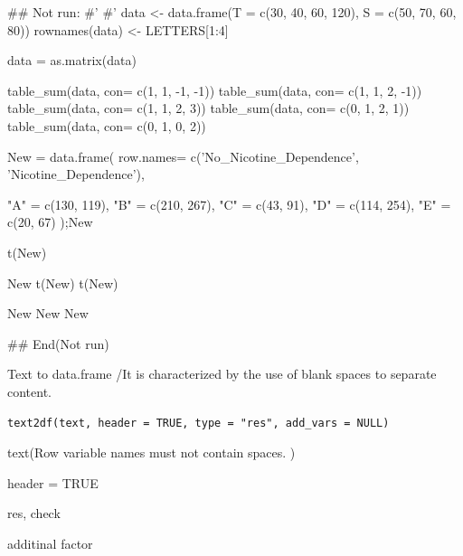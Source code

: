 \documentclass[a4paper]{book}
\begin{document}
%
\begin{Examples}
\begin{ExampleCode}

\#\# Not run: 
#'
#'
data <- data.frame(T = c(30, 40, 60, 120),
                   S = c(50, 70, 60, 80))
rownames(data) <- LETTERS[1:4]

data = as.matrix(data)


table_sum(data, con= c(1, 1, -1, -1))
table_sum(data, con= c(1, 1, 2, -1))
table_sum(data, con= c(1, 1, 2, 3))
table_sum(data, con= c(0, 1, 2, 1))
table_sum(data, con= c(0, 1, 0, 2))

New = data.frame(
  row.names= c('No_Nicotine_Dependence', 'Nicotine_Dependence'),

  "A" = c(130, 119),
  "B" = c(210, 267),
  "C" = c(43, 91),
  "D" = c(114, 254),
  "E" = c(20, 67)
);New

t(New)%

New %
t(New)
t(New)%

New%
New%
New%


## End(Not run)


\end{ExampleCode}
\end{Examples}
%
\begin{Description}
Text to data.frame /It is characterized by the use of blank spaces to separate content.
\end{Description}
%
\begin{Usage}
\begin{verbatim}
text2df(text, header = TRUE, type = "res", add_vars = NULL)
\end{verbatim}
\end{Usage}
%
\begin{Arguments}
\begin{ldescription}
\item[\code{text}] text(Row variable names must not contain spaces. )

\item[\code{header}] header = TRUE

\item[\code{type}] res, check

\item[\code{add\_vars}] additinal factor
\end{ldescription}
\end{Arguments}
\end{document}
